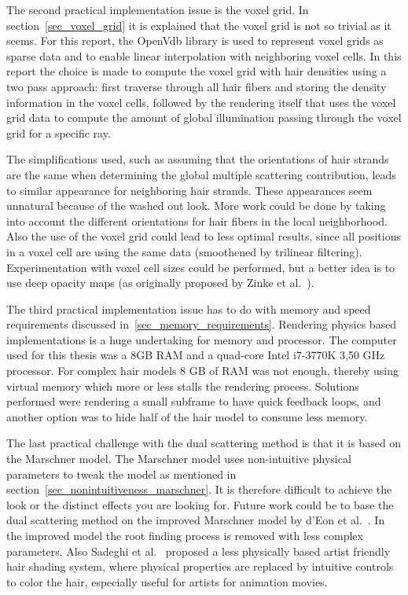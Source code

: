 \documentclass[11pt,a4paper]{report}
\begin{document}
The second practical implementation issue is the voxel grid. In section~\ref{sec_voxel_grid} it is explained that the voxel grid is not so trivial as it seems. For this report, the OpenVdb library is used to represent voxel grids as sparse data and to enable linear interpolation with neighboring voxel cells. In this report the choice is made to compute the voxel grid with hair densities using a two pass approach: first traverse through all hair fibers and storing the density information in the voxel cells, followed by the rendering itself that uses the voxel grid data to compute the amount of global illumination passing through the voxel grid for a specific ray.

The simplifications used, such as assuming that the orientations of hair strands are the same when determining the global multiple scattering contribution, leads to similar appearance for neighboring hair strands. These appearances seem unnatural because of the washed out look. More work could be done by taking into account the different orientations for hair fibers in the local neighborhood. Also the use of the voxel grid could lead to less optimal results, since all positions in a voxel cell are using the same data (smoothened by trilinear filtering). Experimentation with voxel cell sizes could be performed, but a better idea is to use deep opacity maps (as originally proposed by Zinke et al.~\cite{zinke}).

The third practical implementation issue has to do with memory and speed requirements discussed in~\ref{sec_memory_requirements}. Rendering physics based implementations is a huge undertaking for memory and processor. The computer used for this thesis was a 8GB RAM and a quad-core Intel i7-3770K 3,50 GHz processor. For complex hair models 8 GB of RAM was not enough, thereby using virtual memory which more or less stalls the rendering process. Solutions performed were rendering a small subframe to have quick feedback loops, and another option was to hide half of the hair model to consume less memory.

The last practical challenge with the dual scattering method is that it is based on the Marschner model. The Marschner model uses non-intuitive physical parameters to tweak the model as mentioned in section~\ref{sec_nonintuitiveness_marschner}. It is therefore difficult to achieve the look or the distinct effects you are looking for. Future work could be to base the dual scattering method on the improved Marschner model by d'Eon et al.~\cite{eon2011}. In the improved model the root finding process is removed with less complex parameters. Also Sadeghi et al.~\cite{sadeghi2010} proposed a less physically based artist friendly hair shading system, where physical properties are replaced by intuitive controls to color the hair, especially useful for artists for animation movies.
\end{document}
